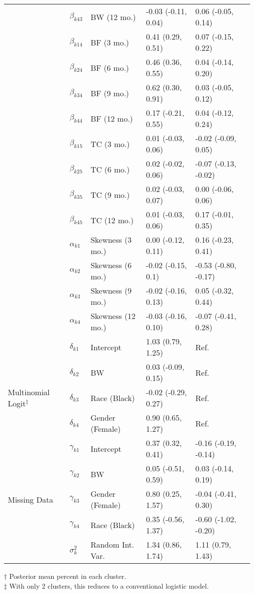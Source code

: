 \documentclass[useAMS,usenatbib,referee]{biom}
\begin{document}
\begin{table}
\begin{center}
\begin{tabular}{@{}llllll@{}}
 & $\beta_{k43}$&BW (12 mo.) & -0.03 (-0.11, 0.04) &  0.06 (-0.05, 0.14) \\
 & $\beta_{k14}$&BF (3 mo.) & 0.41 (0.29, 0.51) & 0.07 (-0.15, 0.22)\\
 & $\beta_{k24}$&BF (6 mo.) & 0.46 (0.36, 0.55) & 0.04 (-0.14, 0.20) \\
 & $\beta_{k34}$&BF (9 mo.) & 0.62 (0.30, 0.91) & 0.03 (-0.05, 0.12) \\
 & $\beta_{k44}$&BF (12 mo.)& 0.17 (-0.21, 0.55) & 0.04 (-0.12, 0.24) \\
 & $\beta_{k15}$&TC (3 mo.) & 0.01 (-0.03, 0.06) & -0.02 (-0.09, 0.05) \\
 & $\beta_{k25}$&TC (6 mo.) & 0.02 (-0.02, 0.06) & -0.07 (-0.13, -0.02) \\
 & $\beta_{k35}$&TC (9 mo.) & 0.02 (-0.03, 0.07) & 0.00 (-0.06, 0.06) \\
 & $\beta_{k45}$&TC (12 mo.) & 0.01 (-0.03, 0.06) & 0.17 (-0.01, 0.35)\\
 \addlinespace[0.2em]
 & $\alpha_{k1}$&Skewness (3 mo.) & 0.00 (-0.12, 0.11) & 0.16 (-0.23, 0.41)\\
 & $\alpha_{k2}$&Skewness (6 mo.) & -0.02 (-0.15, 0.1) & -0.53 (-0.80, -0.17)\\
 & $\alpha_{k3}$&Skewness (9 mo.) & -0.02 (-0.16, 0.13) & 0.05 (-0.32, 0.44)\\
 & $\alpha_{k4}$&Skewness (12 mo.)& -0.03 (-0.16, 0.10) & -0.07 (-0.41, 0.28)\\ \midrule
 & $\delta_{k1}$& Intercept & 1.03 (0.79, 1.25) & Ref. \\
 & $\delta_{k2}$&BW & 0.03 (-0.09, 0.15) & Ref.\\
 Multinomial Logit$^{\ddagger}$ & $\delta_{k3}$&Race (Black) & -0.02 (-0.29, 0.27) & Ref. \\
 & $\delta_{k4}$&Gender (Female) & 0.90 (0.65, 1.27) & Ref. \\ \midrule
 & $\gamma_{k1}$ & Intercept & 0.37 (0.32, 0.41) & -0.16 (-0.19, -0.14)\\
 & $\gamma_{k2}$  & BW & 0.05 (-0.51, 0.59)& 0.03 (-0.14, 0.19)\\
Missing Data  & $\gamma_{k3}$  & Gender (Female) & 0.80 (0.25, 1.57)& -0.04 (-0.41, 0.30)\\
 & $\gamma_{k4}$  & Race (Black)& 0.35 (-0.56, 1.37)  & -0.60 (-1.02, -0.20)\\
 & $\sigma^2_k$ & Random Int. Var. & 1.34 (0.86, 1.74) & 1.11 (0.79, 1.43)\\ \bottomrule
\end{tabular}\vspace{.75cm}
\end{center}
$\dagger$ Posterior mean percent in each cluster.\\
$\ddagger$ With only 2 clusters, this reduces to a conventional logistic model.
\end{table}
\end{document}
